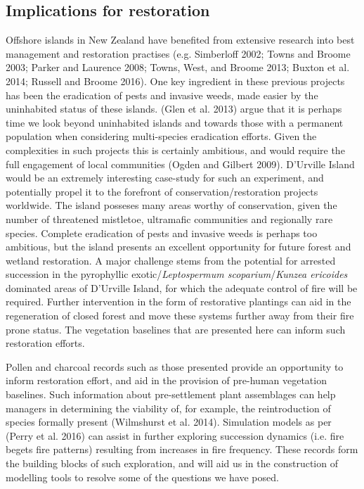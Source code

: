 \documentclass[]{article}
\begin{document}
\subsection{Implications for restoration}\label{implications-for-restoration}

Offshore islands in New Zealand have benefited from extensive research into best management and restoration practises (e.g. Simberloff 2002; Towns and Broome 2003; Parker and Laurence 2008; Towns, West, and Broome 2013; Buxton et al. 2014; Russell and Broome 2016). One key ingredient in these previous projects has been the eradication of pests and invasive weeds, made easier by the uninhabited status of these islands. (Glen et al. 2013) argue that it is perhaps time we look beyond uninhabited islands and towards those with a permanent population when considering multi-species eradication efforts. Given the complexities in such projects this is certainly ambitious, and would require the full engagement of local communities (Ogden and Gilbert 2009). D'Urville Island would be an extremely interesting case-study for such an experiment, and potentially propel it to the forefront of conservation/restoration projects worldwide. The island posseses many areas worthy of conservation, given the number of threatened mistletoe, ultramafic communities and regionally rare species. Complete eradication of pests and invasive weeds is perhaps too ambitious, but the island presents an excellent opportunity for future forest and wetland restoration. A major challenge stems from the potential for arrested succession in the pyrophyllic exotic/\emph{Leptospermum scoparium}/\emph{Kunzea ericoides} dominated areas of D'Urville Island, for which the adequate control of fire will be required. Further intervention in the form of restorative plantings can aid in the regeneration of closed forest and move these systems further away from their fire prone status. The vegetation baselines that are presented here can inform such restoration efforts.

Pollen and charcoal records such as those presented provide an opportunity to inform restoration effort, and aid in the provision of pre-human vegetation baselines. Such information about pre-settlement plant assemblages can help managers in determining the viability of, for example, the reintroduction of species formally present (Wilmshurst et al. 2014). Simulation models as per (Perry et al. 2016) can assist in further exploring succession dynamics (i.e. fire begets fire patterns) resulting from increases in fire frequency. These records form the building blocks of such exploration, and will aid us in the construction of modelling tools to resolve some of the questions we have posed.
\end{document}
